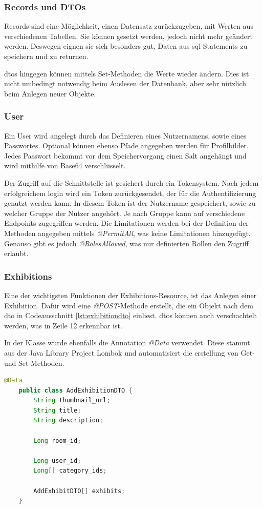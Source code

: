 \subsubsection{Records und DTOs}
Records sind eine Möglichkeit, einen Datensatz zurückzugeben, mit Werten aus verschiedenen Tabellen. 
Sie können gesetzt werden, jedoch nicht mehr geändert werden. 
Deswegen eignen sie sich besonders gut, Daten aus \gls{sql}-Statements zu speichern und zu returnen.

\gls{dto}s hingegen können mittels Set-Methoden die Werte wieder ändern.
Dies ist nicht umbedingt notwendig beim Auslesen der Datenbank, aber sehr nützlich beim Anlegen neuer Objekte. 

\subsubsection{User}
Ein User wird angelegt durch das Definieren eines Nutzernamens, sowie eines Passwortes. 
Optional können ebenso Pfade angegeben werden für Profilbilder. 
Jedes Passwort bekommt vor dem Speichervorgang einen Salt angehängt und wird mithilfe von Base64 verschlüsselt. 

Der Zugriff auf die Schnittstelle ist gesichert durch ein Tokensystem. 
Nach jedem erfolgreichem login wird ein Token zurückgesendet, der für die Authentifizierung genutzt werden kann. 
In diesem Token ist der Nutzername gespeichert, sowie zu welcher Gruppe der Nutzer angehört. 
Je nach Gruppe kann auf verschiedene Endpoints zugegriffen werden. 
Die Limitationen werden bei der Definition der Methoden angegeben mittels \emph{@PermitAll}, was keine Limitationen hinzugefügt.
Genauso gibt es jedoch \emph{@RolesAllowed}, was nur definierten Rollen den Zugriff erlaubt.  


\subsubsection{Exhibitions}
Eine der wichtigsten Funktionen der Exhibitions-Resource, ist das Anlegen einer Exhibition. 
Dafür wird eine \emph{@POST}-Methode erstellt, die ein Objekt nach dem \gls{dto} in Codeausschnitt \ref{lst:exhibitiondto} einliest.
\gls{dto}s können auch verschachtelt werden, was in Zeile 12 erkennbar ist. 

In der Klasse wurde ebenfalls die Annotation \emph{@Data} verwendet. 
Diese stammt aus der Java Library Project Lombok und automatisiert die erstellung von Get- und Set-Methoden. 
\cite{Lambok}

\begin{lstlisting}[label=lst:exhibitiondto, language=Java, caption=Exhibition DTO]
    @Data
    public class AddExhibitionDTO {
        String thumbnail_url;
        String title;
        String description;

        Long room_id;

        Long user_id;
        Long[] category_ids;

        AddExhibitDTO[] exhibits;
    }
\end{lstlisting}

